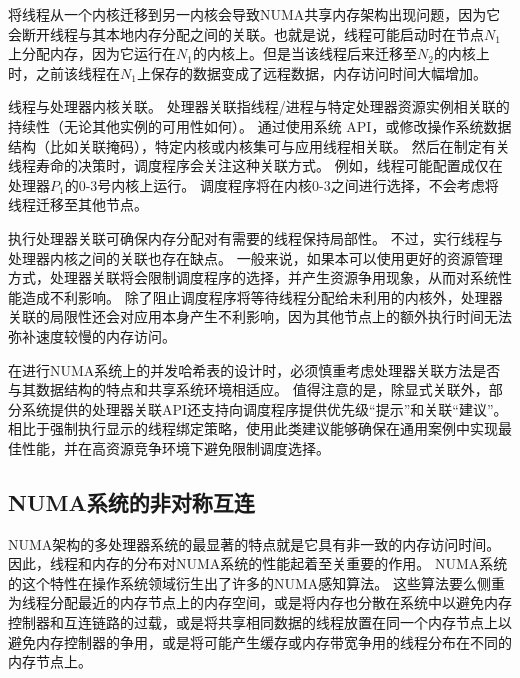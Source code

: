 将线程从一个内核迁移到另一内核会导致NUMA共享内存架构出现问题，因为它会断开线程与其本地内存分配之间的关联。也就是说，线程可能启动时在节点$N_1$上分配内存，因为它运行在$N_1$的内核上。但是当该线程后来迁移至$N_2$的内核上时，之前该线程在$N_1$上保存的数据变成了远程数据，内存访问时间大幅增加。

线程与处理器内核关联。 
处理器关联指线程/进程与特定处理器资源实例相关联的持续性（无论其他实例的可用性如何）。 
通过使用系统 API，或修改操作系统数据结构（比如关联掩码），特定内核或内核集可与应用线程相关联。 然后在制定有关线程寿命的决策时，调度程序会关注这种关联方式。 
例如，线程可能配置成仅在处理器$P_1$的0-3号内核上运行。 
调度程序将在内核0-3之间进行选择，不会考虑将线程迁移至其他节点。

执行处理器关联可确保内存分配对有需要的线程保持局部性。 
不过，实行线程与处理器内核之间的关联也存在缺点。 一般来说，如果本可以使用更好的资源管理方式，处理器关联将会限制调度程序的选择，并产生资源争用现象，从而对系统性能造成不利影响。 
除了阻止调度程序将等待线程分配给未利用的内核外，处理器关联的局限性还会对应用本身产生不利影响，因为其他节点上的额外执行时间无法弥补速度较慢的内存访问。

在进行NUMA系统上的并发哈希表的设计时，必须慎重考虑处理器关联方法是否与其数据结构的特点和共享系统环境相适应。 
值得注意的是，除显式关联外，部分系统提供的处理器关联API还支持向调度程序提供优先级“提示”和关联“建议”。 相比于强制执行显示的线程绑定策略，使用此类建议能够确保在通用案例中实现最佳性能，并在高资源竞争环境下避免限制调度选择\cite{majo2017library}。

\subsection{NUMA系统的非对称互连}
\label{sec:}
NUMA架构的多处理器系统的最显著的特点就是它具有非一致的内存访问时间。
因此，线程和内存的分布对NUMA系统的性能起着至关重要的作用。
NUMA系统的这个特性在操作系统领域衍生出了许多的NUMA感知算法。
这些算法要么侧重为线程分配最近的内存节点上的内存空间\cite{brecht1993importance,lachaize2012memprof,dashti2013traffic}，或是将内存也分散在系统中以避免内存控制器和互连链路的过载\cite{dashti2013traffic}，或是将共享相同数据的线程放置在同一个内存节点上\cite{tam2007thread,tang2013optimizing}以避免内存控制器的争用\cite{bull2002data,blagodurov2010case,tang2013optimizing}，或是将可能产生缓存或内存带宽争用的线程分布在不同的内存节点上。

